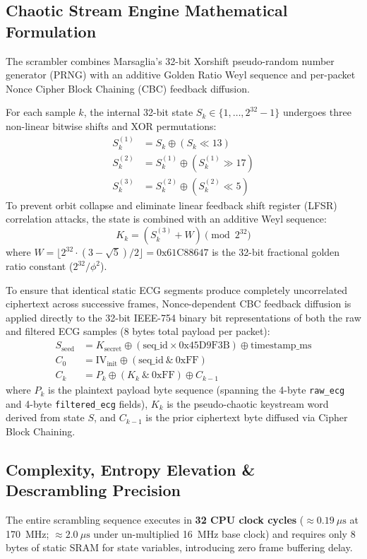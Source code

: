 \documentclass[conference]{IEEEtran}
\begin{document}
\subsection{Chaotic Stream Engine Mathematical Formulation}
The scrambler combines Marsaglia's 32-bit Xorshift pseudo-random number generator (PRNG) \cite{marsaglia2003xorshift} with an additive Golden Ratio Weyl sequence and per-packet Nonce Cipher Block Chaining (CBC) feedback diffusion.

For each sample $k$, the internal 32-bit state $S_k \in \{1, \dots, 2^{32}-1\}$ undergoes three non-linear bitwise shifts and XOR permutations:
\begin{align}
    S_k^{(1)} &= S_k \oplus (S_k \ll 13) \\
    S_k^{(2)} &= S_k^{(1)} \oplus (S_k^{(1)} \gg 17) \\
    S_k^{(3)} &= S_k^{(2)} \oplus (S_k^{(2)} \ll 5)
\end{align}
To prevent orbit collapse and eliminate linear feedback shift register (LFSR) correlation attacks, the state is combined with an additive Weyl sequence:
\begin{equation}
    K_k = (S_k^{(3)} + W) \pmod{2^{32}}
\end{equation}
where $W = \lfloor 2^{32} \cdot (3 - \sqrt{5})/2 \rfloor = \text{0x61C88647}$ is the 32-bit fractional golden ratio constant ($2^{32}/\phi^2$).

To ensure that identical static ECG segments produce completely uncorrelated ciphertext across successive frames, Nonce-dependent CBC feedback diffusion is applied directly to the 32-bit IEEE-754 binary bit representations of both the raw and filtered ECG samples (8 bytes total payload per packet):
\begin{align}
    S_{\text{seed}} &= K_{\text{secret}} \oplus (\text{seq\_id} \times \text{0x45D9F3B}) \oplus \text{timestamp\_ms} \\
    C_0 &= \text{IV}_{\text{init}} \oplus (\text{seq\_id} \ \& \ \text{0xFF}) \\
    C_k &= P_k \oplus (K_k \ \& \ \text{0xFF}) \oplus C_{k-1}
\end{align}
where $P_k$ is the plaintext payload byte sequence (spanning the 4-byte \texttt{raw\_ecg} and 4-byte \texttt{filtered\_ecg} fields), $K_k$ is the pseudo-chaotic keystream word derived from state $S$, and $C_{k-1}$ is the prior ciphertext byte diffused via Cipher Block Chaining.

\subsection{Complexity, Entropy Elevation \& Descrambling Precision}
The entire scrambling sequence executes in \textbf{32 CPU clock cycles} ($\approx 0.19~\mu\text{s}$ at 170~MHz; $\approx 2.0~\mu\text{s}$ under un-multiplied 16~MHz base clock) and requires only 8 bytes of static SRAM for state variables, introducing zero frame buffering delay.
\end{document}
